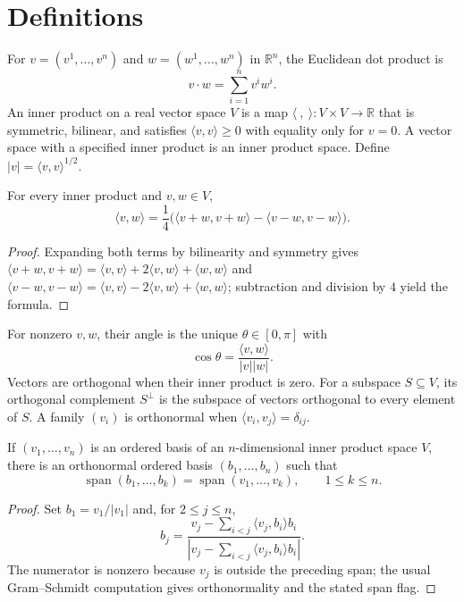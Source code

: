 \section{Definitions}

For $v=(v^1,\ldots,v^n)$ and $w=(w^1,\ldots,w^n)$ in $\mathbb R^n$, the Euclidean dot product is
\[
v\mathbin\cdot w=\sum_{i=1}^n v^i w^i.
\]
An inner product on a real vector space $V$ is a map $\langle\ ,\ \rangle:V\times V\to\mathbb R$ that is symmetric, bilinear, and satisfies $\langle v,v\rangle\ge0$ with equality only for $v=0$. A vector space with a specified inner product is an inner product space. Define $|v|=\langle v,v\rangle^{1/2}$.

\begin{lemma}
\label{lem:polarization-identity}
\leanok
{}
For every inner product and $v,w\in V$,
\[
\langle v,w\rangle=\frac14\bigl(\langle v+w,v+w\rangle-\langle v-w,v-w\rangle\bigr).
\]
\end{lemma}
\begin{proof}
\leanok
\sketch Expanding both terms by bilinearity and symmetry gives $\langle v+w,v+w\rangle=\langle v,v\rangle+2\langle v,w\rangle+\langle w,w\rangle$ and $\langle v-w,v-w\rangle=\langle v,v\rangle-2\langle v,w\rangle+\langle w,w\rangle$; subtraction and division by $4$ yield the formula.
\end{proof}

For nonzero $v,w$, their angle is the unique $\theta\in[0,\pi]$ with
\[
\cos\theta=\frac{\langle v,w\rangle}{|v||w|}.
\]
Vectors are orthogonal when their inner product is zero. For a subspace $S\subseteq V$, its orthogonal complement $S^\perp$ is the subspace of vectors orthogonal to every element of $S$. A family $(v_i)$ is orthonormal when $\langle v_i,v_j\rangle=\delta_{ij}$.

\begin{proposition}
\label{prop:gram-schmidt}
\leanok
{}
If $(v_1,\ldots,v_n)$ is an ordered basis of an $n$-dimensional inner product space $V$, there is an orthonormal ordered basis $(b_1,\ldots,b_n)$ such that
\[
\operatorname{span}(b_1,\ldots,b_k)=\operatorname{span}(v_1,\ldots,v_k),\qquad 1\le k\le n.
\]
\end{proposition}
\begin{proof}
\leanok
\sketch Set $b_1=v_1/|v_1|$ and, for $2\le j\le n$,
\[
b_j=\frac{v_j-\sum_{i<j}\langle v_j,b_i\rangle b_i}{\left|v_j-\sum_{i<j}\langle v_j,b_i\rangle b_i\right|}.
\]
The numerator is nonzero because $v_j$ is outside the preceding span; the usual Gram--Schmidt computation gives orthonormality and the stated span flag.
\end{proof}

